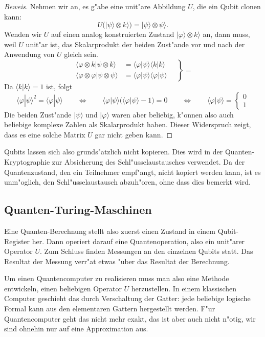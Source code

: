 \begin{proof}[Beweis]
Nehmen wir an, es g"abe eine unit"are Abbildung $U$, die ein Qubit clonen
kann:
\[
U(|\psi\rangle\otimes k\rangle)=|\psi\rangle\otimes\psi\rangle.
\]
Wenden wir $U$ auf einen analog konstruierten Zustand
$|\varphi\rangle\otimes k\rangle$ an, dann muss, weil $U$ unit"ar ist,
das Skalarprodukt der beiden Zust"ande vor und nach der Anwendung
von $U$ gleich sein.
\begin{equation}
\left.
\begin{aligned}
\langle\varphi\otimes k|\psi\otimes k\rangle
&=
\langle\varphi|\psi\rangle \langle k|k\rangle
\\
\langle\varphi\otimes\varphi|\psi\otimes\psi\rangle
&=
\langle\varphi|\psi\rangle \langle \varphi|\psi\rangle
\end{aligned}
\quad
\right\}=
\end{equation}
Da $\langle k|k\rangle=1$ ist, folgt
\[
\langle \varphi|\psi\rangle^2=
\langle \varphi|\psi\rangle
\qquad\Leftrightarrow\qquad
\langle \varphi|\psi\rangle ( \langle \varphi|\psi\rangle -1) = 0
\qquad\Leftrightarrow\qquad
\langle \varphi|\psi\rangle =\begin{cases}0\\1\end{cases}
\]
Die beiden Zust"ande $|\psi\rangle$ und $|\varphi\rangle$ waren aber
beliebig, k"onnen also auch beliebige komplexe Zahlen als Skalarprodukt
haben.
Dieser Widerspruch zeigt, dass es eine solche Matrix $U$ gar nicht
geben kann.
\end{proof}

Qubits lassen sich also grunds"atzlich nicht kopieren.
Dies wird in der Quanten-Kryptographie zur Absicherung des
Schl"usselaustausches verwendet. 
Da der Quantenzustand, den ein Teilnehmer empf"angt, nicht kopiert
werden kann, ist es unm"oglich, den Schl"usselaustausch abzuh"oren,
ohne dass dies bemerkt wird.

\subsection{Quanten-Turing-Maschinen}
Eine Quanten-Berechnung stellt also zuerst einen Zustand in einem
Qubit-Register her.
Dann operiert darauf eine Quantenoperation, also ein unit"arer Operator $U$.
Zum Schluss finden Messungen an den einzelnen Qubits statt.
Das Resultat der Messung verr"at etwas "uber das Resultat der Berechnung.

Um einen Quantencomputer zu realisieren muss man also eine Methode
entwickeln, einen beliebigen Operator $U$ herzustellen.
In einem klassischen Computer geschieht das durch Verschaltung der
Gatter: jede beliebige logische Formal kann aus den elementaren
Gattern hergestellt werden.
F"ur Quantencomputer geht das nicht mehr exakt, das ist aber auch nicht
n"otig, wir sind ohnehin nur auf eine Approximation aus.

